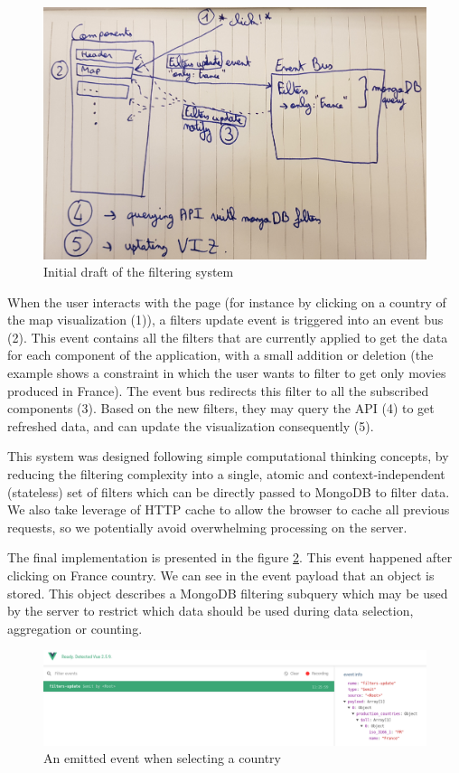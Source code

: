 \documentclass[a4paper,10pt]{article}
\begin{document}
\begin{figure}[ht]
   \centering
   \includegraphics[width=0.6\linewidth]{images/drafts/filtering-system.jpg}
  \caption{Initial draft of the filtering system} \label{fig:draft-filtering}
\end{figure}

When the user interacts with the page (for instance by clicking on a country of the
map visualization (1)), a filters update event is triggered into an event bus (2). This
event contains all the filters that are currently applied to get the data for each
component of the application, with a small addition or deletion (the example shows
a constraint in which the user wants to filter to get only movies produced in France).
The event bus redirects this filter to all the subscribed components (3). Based on
the new filters, they may query the API (4) to get refreshed data, and can update
the visualization consequently (5).

This system was designed following simple computational thinking concepts, by reducing
the filtering complexity into a single, atomic and context-independent (stateless) set of filters which can be directly
passed to MongoDB to filter data. We also take leverage of HTTP cache to allow
the browser to cache all previous requests, so we potentially avoid overwhelming processing
on the server.

The final implementation is presented in the figure \ref{fig:screen-filtering}.
This event happened after clicking on France country. We can see in the event
payload that an object is stored. This object describes a MongoDB filtering subquery
which may be used by the server to restrict which data should be used during data
selection, aggregation or counting.

\begin{figure}[ht]
   \centering
   \includegraphics[width=1\linewidth]{images/screens/filtering-example.png}
  \caption{An emitted event when selecting a country} \label{fig:screen-filtering}
\end{figure}
\end{document}
